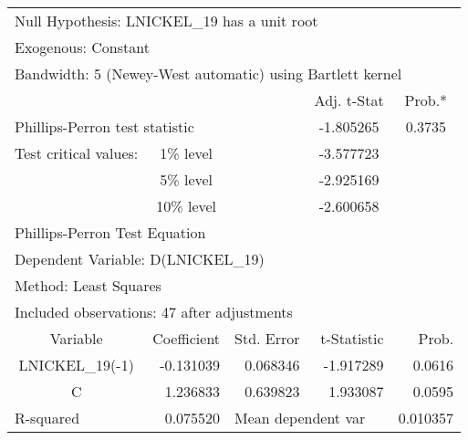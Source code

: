 \begin{tabular}{lrrrr}
\toprule
\multicolumn{4}{l}{Null Hypothesis: LNICKEL\_19 has a unit root}&\multicolumn{1}{c}{}\\
\multicolumn{2}{l}{Exogenous: Constant}&\multicolumn{1}{c}{}&\multicolumn{1}{c}{}&\multicolumn{1}{c}{}\\
\multicolumn{5}{l}{Bandwidth: 5 (Newey-West automatic) using Bartlett kernel}\\
\midrule
\multicolumn{1}{c}{}&\multicolumn{1}{c}{}&\multicolumn{1}{c}{}&\multicolumn{1}{c}{Adj. t-Stat}&\multicolumn{1}{c}{Prob.*}\\
\midrule
\multicolumn{2}{l}{Phillips-Perron test statistic}&\multicolumn{1}{l}{}&\multicolumn{1}{c}{-1.805265}&\multicolumn{1}{c}{0.3735}\\
\multicolumn{1}{l}{Test critical values:}&\multicolumn{1}{c}{1\% level}&\multicolumn{1}{c}{}&\multicolumn{1}{c}{-3.577723}&\multicolumn{1}{c}{}\\
\multicolumn{1}{c}{}&\multicolumn{1}{c}{5\% level}&\multicolumn{1}{c}{}&\multicolumn{1}{c}{-2.925169}&\multicolumn{1}{c}{}\\
\multicolumn{1}{c}{}&\multicolumn{1}{c}{10\% level}&\multicolumn{1}{c}{}&\multicolumn{1}{c}{-2.600658}&\multicolumn{1}{c}{}\\
\midrule
\multicolumn{2}{l}{Phillips-Perron Test Equation}&\multicolumn{1}{c}{}&\multicolumn{1}{c}{}&\multicolumn{1}{c}{}\\
\multicolumn{3}{l}{Dependent Variable: D(LNICKEL\_19)}&\multicolumn{1}{c}{}&\multicolumn{1}{c}{}\\
\multicolumn{2}{l}{Method: Least Squares}&\multicolumn{1}{c}{}&\multicolumn{1}{c}{}&\multicolumn{1}{c}{}\\
\multicolumn{4}{l}{Included observations: 47 after adjustments}&\multicolumn{1}{c}{}\\
\midrule
\multicolumn{1}{c}{Variable}&\multicolumn{1}{r}{Coefficient}&\multicolumn{1}{r}{Std. Error}&\multicolumn{1}{r}{t-Statistic}&\multicolumn{1}{r}{Prob.}\\
\midrule
\multicolumn{1}{c}{LNICKEL\_19(-1)}&\multicolumn{1}{r}{-0.131039}&\multicolumn{1}{r}{0.068346}&\multicolumn{1}{r}{-1.917289}&\multicolumn{1}{r}{0.0616}\\
\multicolumn{1}{c}{C}&\multicolumn{1}{r}{1.236833}&\multicolumn{1}{r}{0.639823}&\multicolumn{1}{r}{1.933087}&\multicolumn{1}{r}{0.0595}\\
\midrule
\multicolumn{1}{l}{R-squared}&\multicolumn{1}{r}{0.075520}&\multicolumn{2}{l}{Mean dependent var}&\multicolumn{1}{r}{0.010357}\\

\end{tabular}
